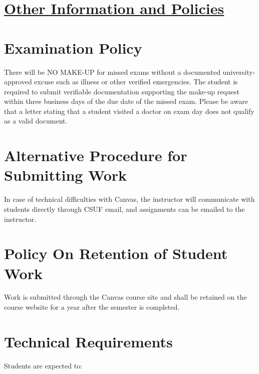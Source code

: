 \documentclass{syllabus}
\begin{document}
{\newpage
\section*{\centering \underline{Other Information and Policies}} \vspace{1em}
\section*{Examination Policy}
There will be NO MAKE-UP for missed exams without a documented university-approved excuse such as illness or other verified emergencies. The student is required to submit verifiable documentation supporting the make-up request within three business days of the due date of the missed exam. Please be aware that a letter stating that a student visited a doctor on exam day does not qualify as a valid document.

\section*{Alternative Procedure for Submitting Work}
In case of technical difficulties with Canvas, the instructor will communicate with students directly through CSUF email, and assignments can be emailed to the instructor.

\section*{Policy On Retention of Student Work}
Work is submitted through the Canvas course site and shall be retained on the course website for a year after the semester is completed.

\section*{Technical Requirements}
Students are expected to:

}
\end{document}
